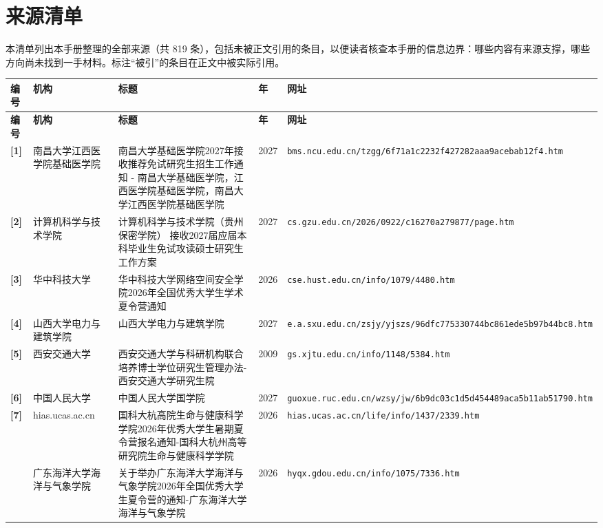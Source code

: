 \chapter{来源清单}
\label{app:all-sources}

\begin{keybox}
本清单列出本手册整理的全部来源（共 819 条），包括未被正文引用的条目，以便读者核查本手册的信息边界：哪些内容有来源支撑，哪些方向尚未找到一手材料。标注“被引”的条目在正文中被实际引用。
\end{keybox}

{\tiny\setlength{\tabcolsep}{3pt}
\begin{longtable}{@{}p{1.15cm}p{2.9cm}p{6.3cm}p{0.85cm}p{5.0cm}@{}}
\toprule
\textbf{编号} & \textbf{机构} & \textbf{标题} & \textbf{年} & \textbf{网址} \\ \midrule
\endfirsthead
\toprule \textbf{编号} & \textbf{机构} & \textbf{标题} & \textbf{年} & \textbf{网址} \\ \midrule
\endhead
\textbf{[1]} & 南昌大学江西医学院基础医学院 & 南昌大学基础医学院2027年接收推荐免试研究生招生工作通知 - 南昌大学基础医学院，江西医学院基础医学院，南昌大学江西医学院基础医学院 & 2027 & \texttt{bms.ncu.edu.cn/tzgg/6f71a1c2232f427282aaa9acebab12f4.htm} \\
\textbf{[2]} & 计算机科学与技术学院 & 计算机科学与技术学院（贵州保密学院） 接收2027届应届本科毕业生免试攻读硕士研究生工作方案 & 2027 & \texttt{cs.gzu.edu.cn/2026/0922/c16270a279877/page.htm} \\
\textbf{[3]} & 华中科技大学 & 华中科技大学网络空间安全学院2026年全国优秀大学生学术夏令营通知 & 2026 & \texttt{cse.hust.edu.cn/info/1079/4480.htm} \\
\textbf{[4]} & 山西大学电力与建筑学院 & 山西大学电力与建筑学院 & 2027 & \texttt{e.a.sxu.edu.cn/zsjy/yjszs/96dfc775330744bc861ede5b97b44bc8.htm} \\
\textbf{[5]} & 西安交通大学 & 西安交通大学与科研机构联合培养博士学位研究生管理办法-西安交通大学研究生院 & 2009 & \texttt{gs.xjtu.edu.cn/info/1148/5384.htm} \\
\textbf{[6]} & 中国人民大学 & 中国人民大学国学院 & 2027 & \texttt{guoxue.ruc.edu.cn/wzsy/jw/6b9dc03c1d5d454489aca5b11ab51790.htm} \\
\textbf{[7]} & hias.ucas.ac.cn & 国科大杭高院生命与健康科学学院2026年优秀大学生暑期夏令营报名通知-国科大杭州高等研究院生命与健康科学学院 & 2026 & \texttt{hias.ucas.ac.cn/life/info/1437/2339.htm} \\
[8] & 广东海洋大学海洋与气象学院 & 关于举办广东海洋大学海洋与气象学院2026年全国优秀大学生夏令营的通知-广东海洋大学海洋与气象学院 & 2026 & \texttt{hyqx.gdou.edu.cn/info/1075/7336.htm} \\

\end{longtable}}
